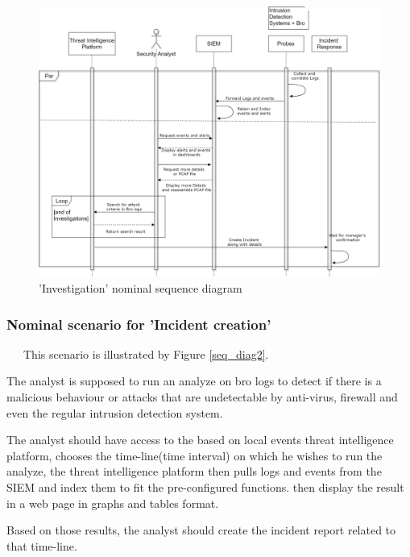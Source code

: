 \begin{figure}[htbp!]
\begin{center}
\includegraphics[height=5.0 in]{images/ATHENAGeneralseq.jpg}
\caption{’Investigation’ nominal sequence diagram}
\label{seq_diag1}
\end{center}
\end{figure} 


\subsubsection* {Nominal scenario for 'Incident creation'}

~~~This scenario is illustrated by Figure \ref{seq_diag2}.

The analyst is supposed to run an analyze on bro logs to detect if there is a malicious behaviour or attacks that are undetectable by anti-virus, firewall and even the regular intrusion detection system.

The analyst should have access to the based on local events threat intelligence platform, chooses the time-line(time interval) on which he wishes to run the analyze, the threat intelligence platform then pulls logs and events from the SIEM and index them to fit the pre-configured functions. then display the result in a web page in graphs and tables format. 

Based on those results, the analyst should create the incident report related to that time-line.


